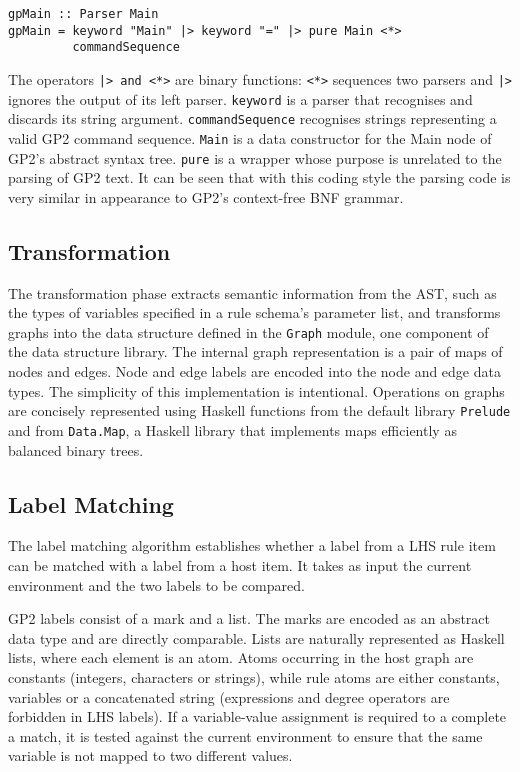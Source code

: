 \begin{verbatim}
gpMain :: Parser Main
gpMain = keyword "Main" |> keyword "=" |> pure Main <*> 
         commandSequence
\end{verbatim}

The operators \texttt{|> and <*>} are binary functions: \texttt{<*>} sequences two parsers and \texttt{|>} ignores the output of its left parser. \texttt{keyword} is a parser that recognises and discards its string argument. \texttt{commandSequence} recognises strings representing a valid GP2 command sequence. \texttt{Main} is a data constructor for the Main node of GP2's abstract syntax tree. \texttt{pure} is a wrapper whose purpose is unrelated to the parsing of GP2 text. It can be seen that with this coding style the parsing code is very similar in appearance to GP2's context-free BNF grammar. 

\subsection{Transformation}

The transformation phase extracts semantic information from the AST, such as the types of variables specified in a rule schema's parameter list, and transforms graphs into the data structure defined in the \texttt{Graph} module, one component of the data structure library. The internal graph representation is a pair of maps of nodes and edges. Node and edge labels are encoded into the node and edge data types. The simplicity of this implementation is intentional. Operations on graphs are concisely represented using Haskell functions from the default library \texttt{Prelude} and from \texttt{Data.Map}, a Haskell library that implements maps efficiently as balanced binary trees.

\subsection{Label Matching}
The label matching algorithm establishes whether a label from a LHS rule item can be matched with a label from a host item. It takes as input the current environment and the two labels to be compared. 

GP2 labels consist of a mark and a list. The marks are encoded as an abstract data type and are directly comparable. Lists are naturally represented as Haskell lists, where each element is an atom. Atoms occurring in the host graph are constants (integers, characters or strings), while rule atoms are either constants, variables or a concatenated string (expressions and degree operators are forbidden in LHS labels). If a variable-value assignment is required to a complete a match, it is tested against the current environment to ensure that the same variable is not mapped to two different values. 

